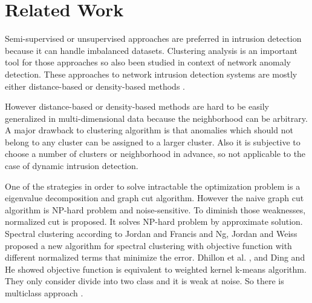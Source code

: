 \section{Related Work}
Semi-supervised or unsupervised approaches are preferred in intrusion detection \cite{chandola09} because it can handle imbalanced datasets.
Clustering analysis is an important tool for those approaches so also been studied in context of network anomaly detection. 
These approaches to network intrusion detection systems are mostly either distance-based \cite{knorr00}\cite{ramaswamy00} or density-based methods \cite{breuning00}\cite{aggarwal01}. 

However distance-based or density-based methods are hard to be easily generalized in multi-dimensional data because the neighborhood can be arbitrary. 
A major drawback to clustering algorithm is that anomalies which should not belong to any cluster can be assigned to a larger cluster. 
Also it is subjective to choose a number of clusters or neighborhood in advance, so not applicable to the case of dynamic intrusion detection. 

One of the strategies in order to solve intractable the optimization problem is a eigenvalue decomposition and graph cut algorithm. 
However the naive graph cut algorithm is NP-hard problem and noise-sensitive. 
To diminish those weaknesses, normalized cut \cite{jianbo00} is proposed. 
It solves NP-hard problem by approximate solution.
Spectral clustering according to Jordan and Francis \cite{jordan04} and Ng, Jordan and Weiss \cite{ng01} proposed a new algorithm for spectral clustering with objective function with different normalized terms that minimize the error.
Dhillon et al. \cite{dhillon04}, and Ding and He \cite{cding04} showed objective function is equivalent to weighted kernel k-means algorithm.
They only consider divide into two class and it is weak at noise. 
So there is multiclass approach \cite{jianbo03}. 


